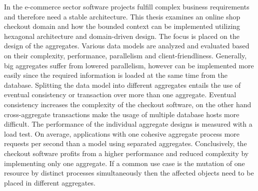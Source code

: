 {{{			In the e-commerce sector software projects fulfill complex business requirements and therefore need a stable architecture. This thesis examines an online shop checkout domain and how the bounded context can be implemented utilizing hexagonal architecture and domain-driven design. The focus is placed on the design of the aggregates. Various data models are analyzed and evaluated based on their complexity, performance, parallelism and client-friendliness. Generally, big aggregates suffer from lowered parallelism, however can be implemented more easily since the required information is loaded at the same time from the database. Splitting the data model into different aggregates entails the use of eventual consistency or transaction over more than one aggregate. Eventual consistency increases the complexity of the checkout software, on the other hand cross-aggregate transactions make the usage of multiple database hosts more difficult. The performance of the individual aggregate designs is measured with a load test. On average, applications with one cohesive aggregate process more requests per second than a model using separated aggregates. Conclusively, the checkout software profits from a higher performance and reduced complexity by implementing only one aggregate. If a common use case is the mutation of one resource by distinct processes simultaneously then the affected objects need to be placed in different aggregates. 
			
			\par}
		\vfill
	}
	
	
 	\pagebreak

	\large
	
	{
		\thispagestyle{plain}
		\vspace*{\fill}
		}}
